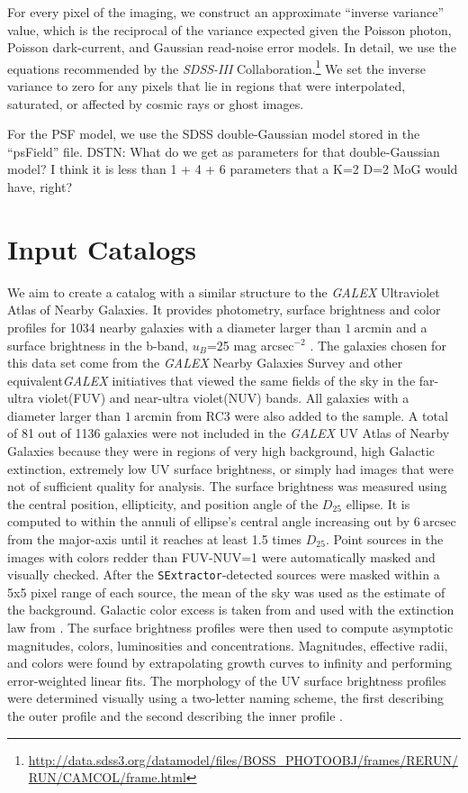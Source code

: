 \documentclass[12pt,preprint,pdftex]{aastex}
\newcommand{\project}[1]{\textsl{#1}}
\newcommand{\units}[1]{\mathrm{#1}}
\renewcommand{\arcmin}{\units{arcmin}}
\renewcommand{\arcsec}{\units{arcsec}}
\begin{document}
For every pixel of the imaging, we construct an approximate ``inverse
variance'' value, which is the reciprocal of the variance expected
given the Poisson photon, Poisson dark-current, and Gaussian
read-noise error models.  In detail, we use the equations recommended
by the \project{SDSS-III}
Collaboration.\footnote{\url{http://data.sdss3.org/datamodel/files/BOSS\_PHOTOOBJ/frames/RERUN/RUN/CAMCOL/frame.html}}
We set the inverse variance to zero for any pixels that lie in regions
that were interpolated, saturated, or affected by cosmic rays or ghost
images.

For the PSF model, we use the SDSS double-Gaussian model stored in the
``psField'' file.  DSTN: What do we get as parameters for that
double-Gaussian model?  I think it is less than 1 + 4 + 6 parameters
that a K=2 D=2 MoG would have, right?

\section{Input Catalogs}
We aim to create a catalog with a similar structure to the
\textit{GALEX} Ultraviolet Atlas of Nearby Galaxies. It provides
photometry, surface brightness and color profiles for 1034 nearby
galaxies with a diameter larger than $1~\arcmin$ and a surface
brightness in the b-band, $u_B$=25 mag arcsec$^{-2}$ . The galaxies
chosen for this data set come from the \textit{GALEX} Nearby Galaxies
Survey and other equivalent\textit{GALEX} initiatives that viewed the
same fields of the sky in the far-ultra violet(FUV) and near-ultra
violet(NUV) bands. All galaxies with a diameter larger than
$1~\arcmin$ from RC3 were also added to the sample. A total of 81 out
of 1136 galaxies were not included in the \emph{GALEX} UV Atlas of
Nearby Galaxies because they were in regions of very high background,
high Galactic extinction, extremely low UV surface brightness, or
simply had images that were not of sufficient quality for
analysis. The surface brightness was measured using the central
position, ellipticity, and position angle of the $D_{25}$ ellipse. It is
computed to within the annuli of ellipse's central angle increasing
out by $6~\arcsec$ from the major-axis until it reaches at least 1.5
times $D_{25}$. Point sources in the images with colors redder than
FUV-NUV=1 were automatically masked and visually checked. After the
\verb|SExtractor|-detected\citep{sextractor} sources were masked within a 5x5 pixel
range of each source, the mean of the sky was used as the estimate of
the background. Galactic color excess is taken from
\cite{schlegel98} and used with the extinction law from
\cite{cardelli}. The surface brightness profiles were then used to
compute asymptotic magnitudes, colors, luminosities and
concentrations. Magnitudes, effective radii, and colors were found by
extrapolating growth curves to infinity and performing error-weighted
linear fits. The morphology of the UV surface brightness profiles were
determined visually using a two-letter naming scheme, the first
describing the outer profile and the second describing the inner
profile \citep{gdp06}.
\end{document}
